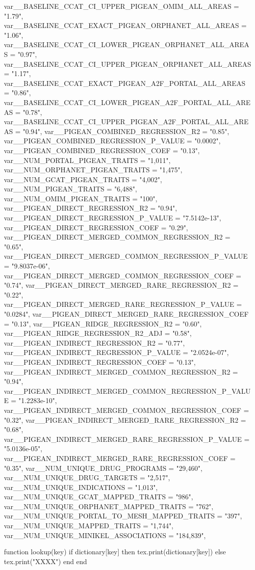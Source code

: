 \begin{luacode*}
{		var__BASELINE_CCAT_CI_UPPER_PIGEAN_OMIM_ALL_AREAS = "1.79",
		var__BASELINE_CCAT_EXACT_PIGEAN_ORPHANET_ALL_AREAS = "1.06",
		var__BASELINE_CCAT_CI_LOWER_PIGEAN_ORPHANET_ALL_AREAS = "0.97",
		var__BASELINE_CCAT_CI_UPPER_PIGEAN_ORPHANET_ALL_AREAS = "1.17",
		var__BASELINE_CCAT_EXACT_PIGEAN_A2F_PORTAL_ALL_AREAS = "0.86",
		var__BASELINE_CCAT_CI_LOWER_PIGEAN_A2F_PORTAL_ALL_AREAS = "0.78",
		var__BASELINE_CCAT_CI_UPPER_PIGEAN_A2F_PORTAL_ALL_AREAS = "0.94",
		var__PIGEAN_COMBINED_REGRESSION_R2 = "0.85",
		var__PIGEAN_COMBINED_REGRESSION_P_VALUE = "0.0002",
		var__PIGEAN_COMBINED_REGRESSION_COEF = "0.13",
		var__NUM_PORTAL_PIGEAN_TRAITS = "1,011",
		var__NUM_ORPHANET_PIGEAN_TRAITS = "1,475",
		var__NUM_GCAT_PIGEAN_TRAITS = "4,002",
		var__NUM_PIGEAN_TRAITS = "6,488",
		var__NUM_OMIM_PIGEAN_TRAITS = "100",
		var__PIGEAN_DIRECT_REGRESSION_R2 = "0.94",
		var__PIGEAN_DIRECT_REGRESSION_P_VALUE = "7.5142e-13",
		var__PIGEAN_DIRECT_REGRESSION_COEF = "0.29",
		var__PIGEAN_DIRECT_MERGED_COMMON_REGRESSION_R2 = "0.65",
		var__PIGEAN_DIRECT_MERGED_COMMON_REGRESSION_P_VALUE = "9.8037e-06",
		var__PIGEAN_DIRECT_MERGED_COMMON_REGRESSION_COEF = "0.74",
		var__PIGEAN_DIRECT_MERGED_RARE_REGRESSION_R2 = "0.22",
		var__PIGEAN_DIRECT_MERGED_RARE_REGRESSION_P_VALUE = "0.0284",
		var__PIGEAN_DIRECT_MERGED_RARE_REGRESSION_COEF = "0.13",
		var__PIGEAN_RIDGE_REGRESSION_R2 = "0.60",
		var__PIGEAN_RIDGE_REGRESSION_R2_ADJ = "0.58",
		var__PIGEAN_INDIRECT_REGRESSION_R2 = "0.77",
		var__PIGEAN_INDIRECT_REGRESSION_P_VALUE = "2.0524e-07",
		var__PIGEAN_INDIRECT_REGRESSION_COEF = "0.13",
		var__PIGEAN_INDIRECT_MERGED_COMMON_REGRESSION_R2 = "0.94",
		var__PIGEAN_INDIRECT_MERGED_COMMON_REGRESSION_P_VALUE = "1.2283e-10",
		var__PIGEAN_INDIRECT_MERGED_COMMON_REGRESSION_COEF = "0.32",
		var__PIGEAN_INDIRECT_MERGED_RARE_REGRESSION_R2 = "0.68",
		var__PIGEAN_INDIRECT_MERGED_RARE_REGRESSION_P_VALUE = "5.0136e-05",
		var__PIGEAN_INDIRECT_MERGED_RARE_REGRESSION_COEF = "0.35",
		var__NUM_UNIQUE_DRUG_PROGRAMS = "29,460",
		var__NUM_UNIQUE_DRUG_TARGETS = "2,517",
		var__NUM_UNIQUE_INDICATIONS = "1,013",
		var__NUM_UNIQUE_GCAT_MAPPED_TRAITS = "986",
		var__NUM_UNIQUE_ORPHANET_MAPPED_TRAITS = "762",
		var__NUM_UNIQUE_PORTAL_TO_MESH_MAPPED_TRAITS = "397",
		var__NUM_UNIQUE_MAPPED_TRAITS = "1,744",
		var__NUM_UNIQUE_MINIKEL_ASSOCIATIONS = "184,839",

    }
    
    function lookup(key)
        if dictionary[key] then
            tex.print(dictionary[key])
        else
            tex.print("XXXX")
        end
    end
\end{luacode*}
